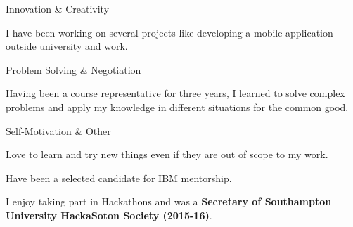 

\begin{cventries}
	
	\cvmyskills
	{Innovation \& Creativity} %
    {}
	{}
	{}
	{
				\begin{cvitems}
					I have been working on several projects like developing a mobile application outside university and work.
				\end{cvitems}
	}


	\cvmyskills
	{Problem Solving \& Negotiation} %
	{}
	{}
	{}
	{
	\begin{cvitems}
		Having been a course representative for three years, I learned to solve complex problems and apply my knowledge in different situations for the common good.
	\end{cvitems}
	}


	\cvmyskills
	{Self-Motivation \& Other} %
	{}
	{}
	{}
	{
		\begin{cvitems} %
		\item {
				Love to learn and try new things even if they are out of scope to my work.
			}
		\item {	Have been a selected candidate for IBM mentorship. }
		\item { 
				I enjoy taking part in Hackathons and was a \textbf{Secretary of Southampton University HackaSoton Society (2015-16)}.
			}
		\end{cvitems}
	}

	
\end{cventries}
